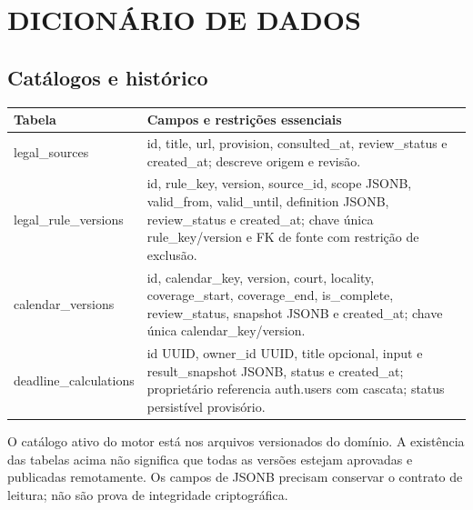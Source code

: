 \chapter{DICIONÁRIO DE DADOS}
\label{chapter-B}
\section{Catálogos e histórico}
\label{section-B-1}
\begin{quadro}[H]\centering
\caption{Tabelas públicas de fontes e versões}
\label{quadro-4}
\begin{singlespace}\fontsize{10}{12}\selectfont
\begin{tabularx}{\linewidth}{|>{\raggedright\arraybackslash}X|>{\raggedright\arraybackslash}X|}
\hline
\textbf{Tabela} & \textbf{Campos e restrições essenciais} \\
\hline
legal\_sources & id, title, url, provision, consulted\_at, review\_status e created\_at; descreve origem e revisão. \\
\hline
legal\_rule\_versions & id, rule\_key, version, source\_id, scope JSONB, valid\_from, valid\_until, definition JSONB, review\_status e created\_at; chave única rule\_key/version e FK de fonte com restrição de exclusão. \\
\hline
calendar\_versions & id, calendar\_key, version, court, locality, coverage\_start, coverage\_end, is\_complete, review\_status, snapshot JSONB e created\_at; chave única calendar\_key/version. \\
\hline
deadline\_calculations & id UUID, owner\_id UUID, title opcional, input e result\_snapshot JSONB, status e created\_at; proprietário referencia auth.users com cascata; status persistível provisório. \\
\hline
\end{tabularx}\end{singlespace}
\par{}
\end{quadro}
O catálogo ativo do motor está nos arquivos versionados do domínio. A existência das tabelas acima não significa que todas as versões estejam aprovadas e publicadas remotamente. Os campos de JSONB precisam conservar o contrato de leitura; não são prova de integridade criptográfica.


